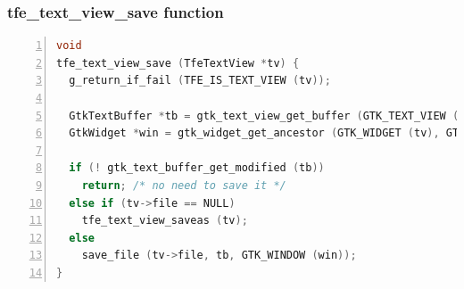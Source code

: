\subsubsection{tfe\_text\_view\_save
function}\label{tfe_text_view_save-function}

\begin{lstlisting}[language=C, numbers=left]
void
tfe_text_view_save (TfeTextView *tv) {
  g_return_if_fail (TFE_IS_TEXT_VIEW (tv));

  GtkTextBuffer *tb = gtk_text_view_get_buffer (GTK_TEXT_VIEW (tv));
  GtkWidget *win = gtk_widget_get_ancestor (GTK_WIDGET (tv), GTK_TYPE_WINDOW);

  if (! gtk_text_buffer_get_modified (tb))
    return; /* no need to save it */
  else if (tv->file == NULL)
    tfe_text_view_saveas (tv);
  else
    save_file (tv->file, tb, GTK_WINDOW (win));
}
\end{lstlisting}

